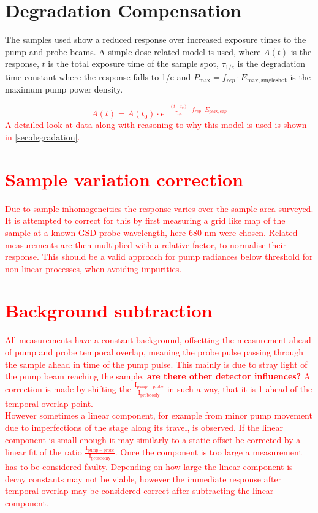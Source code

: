 \documentclass[twoside,openright]{scrreprt}
\begin{document}
\section{Degradation Compensation}
The samples used show a reduced response over increased exposure times to the pump and probe beams. A simple dose related model is used, where $A(t)$ is the response, $t$ is the total exposure time of the sample spot, $\tau_{1/e}$ is the degradation time constant where the response falls to 1/e and $P_{\mathrm{max}} = f_{rep}\cdot E_{\mathrm{max, single shot}}$ is the maximum pump power density.
\textcolor{red}{
\begin{equation}
A(t) = A(t_0)\cdot e^{-\frac{(t-t_0)}{\tau_{1/e}}\cdot f_{rep}\cdot E_{peak,exp}}
\end{equation}
A detailed look at data along with reasoning to why this model is used is shown in \ref{sec:degradation}.

\section{Sample variation correction}
Due to sample inhomogeneities  the response varies over the sample area surveyed. It is attempted to correct for this by first measuring a grid like map of the sample at a known GSD probe wavelength, here 680 nm were chosen. Related measurements are then multiplied with a relative factor, to normalise their response. This should be a valid approach for pump radiances below threshold for  non-linear processes, when avoiding impurities.

\section{Background subtraction}
All measurements have a constant background, offsetting the measurement ahead of pump and probe temporal overlap, meaning the probe pulse passing through the sample ahead in time of the pump pulse. This mainly is due to stray light of the pump beam reaching the sample. \textbf{are there other detector influences?} A correction is made by shifting the $\mathrm{\frac{I_{pump-probe}}{I_{probe\, only}}}$ in such a way, that it is 1 ahead of the temporal overlap point. \\
However sometimes a linear component, for example from minor pump movement due to imperfections of the stage along its travel, is observed. If the linear component is small enough it may similarly to a static offset be corrected by a linear fit of the ratio $\mathrm{\frac{I_{pump-probe}}{I_{probe\, only}}}$. Once the component is too large a measurement has to be considered faulty. Depending on how large the linear component is decay constants may not be viable, however the immediate response after temporal overlap may be considered correct after subtracting the linear component.\\

}
\end{document}
